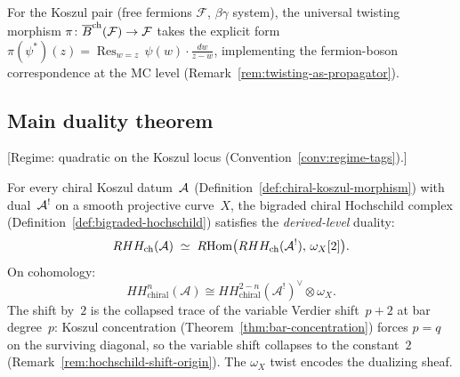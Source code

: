 \begin{example}
\label{ex:fermion-boson-twisting}
For the Koszul pair (free fermions $\mathcal{F}$, $\beta\gamma$
system), the universal twisting morphism
$\pi\colon \overline{B}^{\mathrm{ch}}(\mathcal{F}) \to \mathcal{F}$
takes the explicit form
$\pi(\psi^*)(z) = \operatorname{Res}_{w=z}\, \psi(w) \cdot \frac{dw}{z-w}$,
implementing the fermion-boson correspondence at the MC level
(Remark~\ref{rem:twisting-as-propagator}).
\end{example}

\subsection{Main duality theorem}\label{subsec:hochschild-duality}

\begin{theorem}
\label{thm:main-koszul-hoch}
\textup{[Regime: quadratic on the Koszul locus
\textup{(}Convention~\textup{\ref{conv:regime-tags})}.]}

For every chiral Koszul datum~$\mathcal{A}$
\textup{(}Definition~\textup{\ref{def:chiral-koszul-morphism})} with
dual~$\mathcal{A}^!$ on a smooth projective curve~$X$, the bigraded chiral
Hochschild complex
\textup{(}Definition~\textup{\ref{def:bigraded-hochschild})} satisfies
the \emph{derived-level} duality:
\begin{equation}\label{eq:hochschild-H-derived}
RHH_{\mathrm{ch}}(\mathcal{A})
\;\simeq\;
R\mathrm{Hom}\bigl(RHH_{\mathrm{ch}}(\mathcal{A}^!),\, \omega_X[2]\bigr).
\end{equation}
On cohomology:
\[
HH^n_{\mathrm{chiral}}(\mathcal{A}) \cong HH^{2-n}_{\mathrm{chiral}}(\mathcal{A}^!)^{\vee} \otimes \omega_X.
\]
The shift by~$2$ is the collapsed trace of the variable Verdier
shift~$p+2$ at bar degree~$p$: Koszul concentration
\textup{(}Theorem~\textup{\ref{thm:bar-concentration})} forces
$p = q$ on the surviving diagonal, so the variable
shift collapses to the constant~$2$
\textup{(}Remark~\textup{\ref{rem:hochschild-shift-origin})}.
The $\omega_X$ twist encodes the dualizing sheaf.
\end{theorem}

